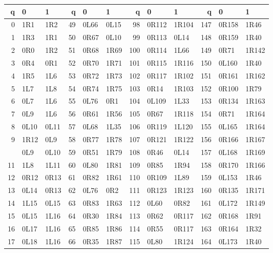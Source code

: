 \begin{center}
\footnotesize\ttfamily
\setlength{\tabcolsep}{4pt}\renewcommand{\arraystretch}{1.09}
\begin{tabular}{rll@{\hspace{16pt}}rll@{\hspace{16pt}}rll@{\hspace{16pt}}rll}
\toprule
q & 0 & 1 & q & 0 & 1 & q & 0 & 1 & q & 0 & 1\\
\midrule
0 & 1R1 & 1R2 & 49 & 0L66 & 0L15 & 98 & 0R112 & 1R104 & 147 & 0R158 & 1R46\\
1 & 1R3 & 1R1 & 50 & 0R67 & 0L10 & 99 & 0R113 & 0L14 & 148 & 0R159 & 1R40\\
2 & 0R0 & 1R2 & 51 & 0R68 & 1R69 & 100 & 0R114 & 1L66 & 149 & 0R71 & 1R142\\
3 & 0R4 & 0R1 & 52 & 0R70 & 1R71 & 101 & 0R115 & 1R116 & 150 & 0L160 & 1R40\\
4 & 1R5 & 1L6 & 53 & 0R72 & 1R73 & 102 & 0R117 & 1R102 & 151 & 0R161 & 1R162\\
5 & 1L7 & 1L8 & 54 & 0R74 & 1R75 & 103 & 0R14 & 1R103 & 152 & 0R100 & 1R79\\
6 & 0L7 & 1L6 & 55 & 0L76 & 0R1 & 104 & 0L109 & 1L33 & 153 & 0R134 & 1R163\\
7 & 0L9 & 1L6 & 56 & 0R61 & 1R56 & 105 & 0R67 & 1R118 & 154 & 0R71 & 1R164\\
8 & 0L10 & 0L11 & 57 & 0L68 & 1L35 & 106 & 0R119 & 1L120 & 155 & 0L165 & 1R164\\
9 & 1R12 & 0L9 & 58 & 0R77 & 1R78 & 107 & 0R121 & 1R122 & 156 & 0R166 & 1R167\\
\addlinespace[2pt]
10 & 0L9 & 0L10 & 59 & 0R51 & 1R79 & 108 & 0R46 & 0L14 & 157 & 0L168 & 1R169\\
11 & 1L8 & 1L11 & 60 & 0L80 & 1R81 & 109 & 0R85 & 1R94 & 158 & 0R170 & 1R166\\
12 & 0R12 & 0R13 & 61 & 0R82 & 1R61 & 110 & 0R109 & 1L89 & 159 & 0L153 & 1R46\\
13 & 0L14 & 0R13 & 62 & 0L76 & 0R2 & 111 & 0R123 & 1R123 & 160 & 0R135 & 1R171\\
14 & 1L15 & 0L15 & 63 & 0R83 & 1R63 & 112 & 0L60 & 0R82 & 161 & 0L172 & 1R149\\
15 & 0L15 & 1L16 & 64 & 0R30 & 1R84 & 113 & 0R62 & 0R117 & 162 & 0R168 & 1R91\\
16 & 0L17 & 1L16 & 65 & 0R85 & 1R86 & 114 & 0R55 & 0R117 & 163 & 0R164 & 1R32\\
17 & 0L18 & 1L16 & 66 & 0R35 & 1R87 & 115 & 0L80 & 1R124 & 164 & 0L173 & 1R40\\

\end{tabular}
\end{center}
